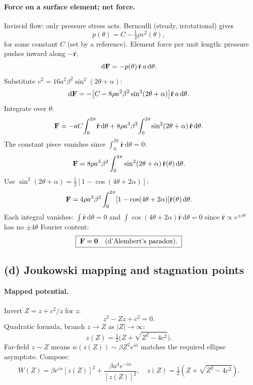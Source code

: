 \documentclass[11pt]{article}
\newcommand{\de}{\mathrm{d}}
\newcommand{\rhat}{\hat{\mathbf{r}}}
\begin{document}
\paragraph{Force on a surface element; net force.} Inviscid flow: only pressure stress acts. Bernoulli (steady, irrotational) gives
\[ p(\theta) = C - \tfrac12\rho v^{2}(\theta), \]
for some constant $C$ (set by a reference). Element force per unit length: pressure pushes inward along $-\rhat$,
\[ \de\vb F = -p(\theta)\,\rhat\,a\,\de\theta. \]
Substitute $v^{2}=16a^{2}\beta^{2}\sin^{2}(2\theta+\alpha)$:
\[ \de\vb F = -\bigl[C - 8\rho a^{2}\beta^{2}\sin^{2}(2\theta+\alpha)\bigr]\rhat\,a\,\de\theta. \]
Integrate over $\theta$:
\[ \vb F = -aC\!\int_{0}^{2\pi}\!\rhat\,\de\theta + 8\rho a^{3}\beta^{2}\!\int_{0}^{2\pi}\!\sin^{2}(2\theta+\alpha)\,\rhat\,\de\theta. \]
The constant piece vanishes since $\int_{0}^{2\pi}\rhat\,\de\theta = 0$:
\[ \vb F = 8\rho a^{3}\beta^{2}\int_{0}^{2\pi}\sin^{2}(2\theta+\alpha)\,\rhat(\theta)\,\de\theta. \]
Use $\sin^{2}(2\theta+\alpha)=\tfrac12[1-\cos(4\theta+2\alpha)]$:
\[ \vb F = 4\rho a^{3}\beta^{2}\int_{0}^{2\pi}[1-\cos(4\theta+2\alpha)]\rhat(\theta)\,\de\theta. \]
Each integral vanishes: $\int\rhat\,\de\theta=0$ and $\int\cos(4\theta+2\alpha)\rhat\,\de\theta=0$ since $\rhat\propto e^{\pm i\theta}$ has no $\pm 4\theta$ Fourier content:
\begin{equation}
\boxed{\;\vb F = \vb 0\quad\text{(d'Alembert's paradox).}\;}
\label{eq:F0}
\end{equation}

\subsection*{(d) Joukowski mapping and stagnation points}

\paragraph{Mapped potential.} Invert $Z=z+c^{2}/z$ for $z$:
\[ z^{2} - Zz + c^{2} = 0. \]
Quadratic formula, branch $z\to Z$ as $|Z|\to\infty$:
\[ z(Z) = \tfrac12\bigl(Z+\sqrt{Z^{2}-4c^{2}}\bigr). \]
Far-field $z\sim Z$ means $w(z(Z))\sim\beta Z^{2}e^{i\alpha}$ matches the required ellipse asymptote. Compose:
\begin{equation}
\boxed{\;W(Z) = \beta e^{i\alpha}[z(Z)]^{2} + \frac{\beta a^{4}e^{-i\alpha}}{[z(Z)]^{2}},\quad z(Z)=\tfrac12\!\left(Z+\sqrt{Z^{2}-4c^{2}}\right).\;}
\label{eq:WZ}
\end{equation}
\end{document}
